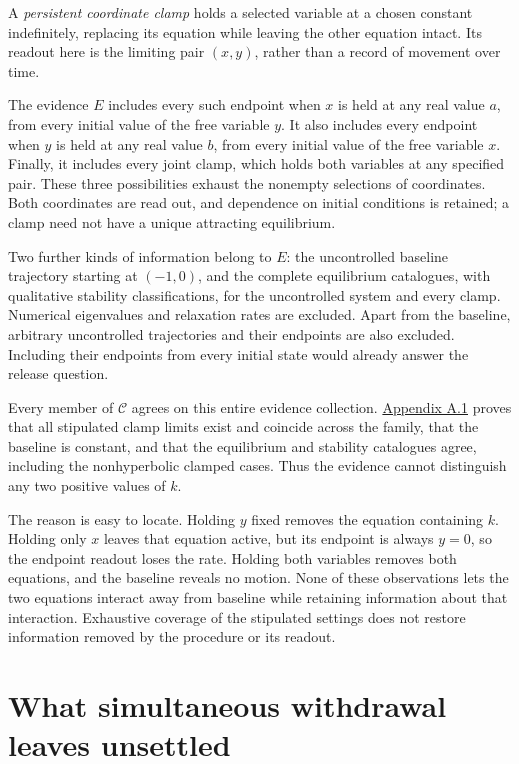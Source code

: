 A \emph{persistent coordinate clamp} holds a selected variable at a chosen constant indefinitely, replacing its equation while leaving the other equation intact. Its readout here is the limiting pair \((x,y)\), rather than a record of movement over time.

The evidence \(E\) includes every such endpoint when \(x\) is held at any real value \(a\), from every initial value of the free variable \(y\). It also includes every endpoint when \(y\) is held at any real value \(b\), from every initial value of the free variable \(x\). Finally, it includes every joint clamp, which holds both variables at any specified pair. These three possibilities exhaust the nonempty selections of coordinates. Both coordinates are read out, and dependence on initial conditions is retained; a clamp need not have a unique attracting equilibrium.

Two further kinds of information belong to \(E\): the uncontrolled baseline trajectory starting at \((-1,0)\), and the complete equilibrium catalogues, with qualitative stability classifications, for the uncontrolled system and every clamp. Numerical eigenvalues and relaxation rates are excluded. Apart from the baseline, arbitrary uncontrolled trajectories and their endpoints are also excluded. Including their endpoints from every initial state would already answer the release question.

Every member of \(\mathcal C\) agrees on this entire evidence collection. \hyperref[app:a.1]{Appendix A.1} proves that all stipulated clamp limits exist and coincide across the family, that the baseline is constant, and that the equilibrium and stability catalogues agree, including the nonhyperbolic clamped cases. Thus the evidence cannot distinguish any two positive values of \(k\).

The reason is easy to locate. Holding \(y\) fixed removes the equation containing \(k\). Holding only \(x\) leaves that equation active, but its endpoint is always \(y=0\), so the endpoint readout loses the rate. Holding both variables removes both equations, and the baseline reveals no motion. None of these observations lets the two equations interact away from baseline while retaining information about that interaction. Exhaustive coverage of the stipulated settings does not restore information removed by the procedure or its readout.

\section*{What simultaneous withdrawal leaves unsettled}

